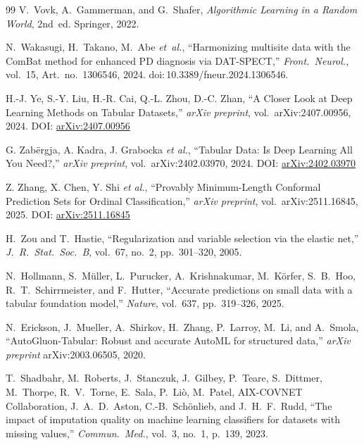 \documentclass[10pt,letterpaper]{article}
\begin{document}
\begin{thebibliography}{99}
V.~Vovk, A.~Gammerman, and G.~Shafer, \textit{Algorithmic Learning in a Random World}, 2nd~ed. Springer, 2022.

N.~Wakasugi, H.~Takano, M.~Abe \textit{et~al.}, ``Harmonizing multisite data with the ComBat method for enhanced PD diagnosis via DAT-SPECT,'' \textit{Front.\ Neurol.}, vol.~15, Art.\ no.~1306546, 2024. doi:\,10.3389/fneur.2024.1306546.

H.-J. Ye, S.-Y. Liu, H.-R. Cai, Q.-L. Zhou, D.-C. Zhan,
``A Closer Look at Deep Learning Methods on Tabular Datasets,''
\textit{arXiv preprint}, vol.~arXiv:2407.00956, 2024. DOI: \href{https://arxiv.org/abs/2407.00956}{arXiv:2407.00956}

G. Zabërgja, A. Kadra, J. Grabocka \textit{et al.},
``Tabular Data: Is Deep Learning All You Need?,''
\textit{arXiv preprint}, vol.~arXiv:2402.03970, 2024. DOI: \href{https://arxiv.org/abs/2402.03970}{arXiv:2402.03970}

Z. Zhang, X. Chen, Y. Shi \textit{et al.},
``Provably Minimum-Length Conformal Prediction Sets for Ordinal Classification,''
\textit{arXiv preprint}, vol.~arXiv:2511.16845, 2025. DOI: \href{https://arxiv.org/abs/2511.16845}{arXiv:2511.16845}

H.~Zou and T.~Hastie, ``Regularization and variable selection via the elastic net,'' \textit{J.\ R.\ Stat.\ Soc.\ B}, vol.~67, no.~2, pp.~301--320, 2005.

N.~Hollmann, S.~M\"uller, L.~Purucker, A.~Krishnakumar, M.~K\"orfer, S.~B.~Hoo, R.~T.~Schirrmeister, and F.~Hutter, ``Accurate predictions on small data with a tabular foundation model,'' \textit{Nature}, vol.~637, pp.~319--326, 2025.

N.~Erickson, J.~Mueller, A.~Shirkov, H.~Zhang, P.~Larroy, M.~Li, and A.~Smola, ``AutoGluon-Tabular: Robust and accurate AutoML for structured data,'' \textit{arXiv preprint} arXiv:2003.06505, 2020.

T.~Shadbahr, M.~Roberts, J.~Stanczuk, J.~Gilbey, P.~Teare, S.~Dittmer, M.~Thorpe, R.~V.~Torne, E.~Sala, P.~Li\`o, M.~Patel, AIX-COVNET Collaboration, J.~A.~D.~Aston, C.-B.~Sch\"onlieb, and J.~H.~F.~Rudd, ``The impact of imputation quality on machine learning classifiers for datasets with missing values,'' \textit{Commun.\ Med.}, vol.~3, no.~1, p.~139, 2023.


\end{thebibliography}
\end{document}
